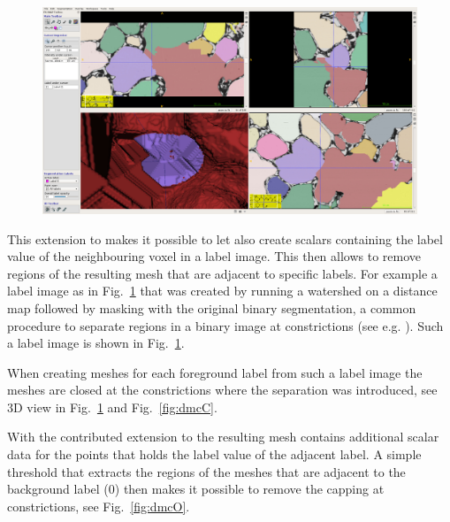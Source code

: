 \documentclass{InsightArticle}
\begin{document}
\begin{figure}[!b]
\center
\includegraphics[width=\textwidth]{images/vtkDiscreteMarchingCubes_extension_07}
\label{fig:labelimage}
\end{figure}


This extension to  makes it possible to let  also create  scalars containing the label value of the neighbouring voxel in a label image. This then allows to remove regions of the resulting mesh that are adjacent to specific labels. For example a label image as in Fig.~\ref{fig:labelimage} that was created by running a watershed on a distance map followed by masking with the original binary segmentation, a common procedure to separate regions in a binary image at constrictions (see e.g. \citet{Beare2006b}). Such a label image is shown in Fig.~\ref{fig:labelimage}.

When creating meshes for each foreground label from such a label image the meshes are closed at the constrictions where the separation was introduced, see 3D view in Fig.~\ref{fig:labelimage} and Fig.~\ref{fig:dmcC}.

With the contributed extension to  the resulting mesh contains additional scalar data for the points that holds the label value of the adjacent label. A simple threshold that extracts the regions of the meshes that are adjacent to the background label (0) then makes it possible to remove the capping at constrictions, see Fig.~\ref{fig:dmcO}.
\end{document}
